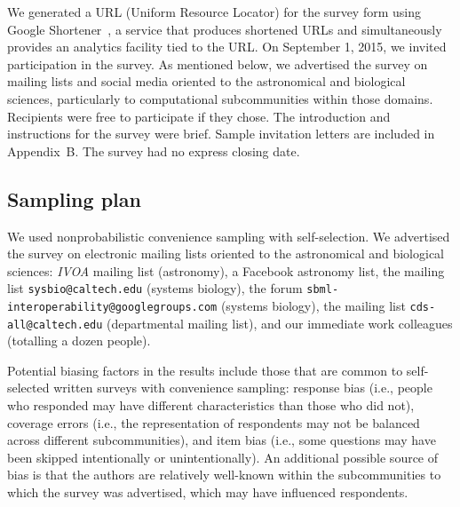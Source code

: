 \documentclass{casicswhitepaper}
\begin{document}
We generated a URL (Uniform Resource Locator) for the survey form using Google Shortener~\cite{googl}, a service that produces shortened URLs and simultaneously provides an analytics facility tied to the URL.  On September 1, 2015, we invited participation in the survey.  As mentioned below, we advertised the survey on mailing lists and social media oriented to the astronomical and biological sciences, particularly to computational subcommunities within those domains.  Recipients were free to participate if they chose.  The introduction and instructions for the survey were brief.  Sample invitation letters are included in Appendix~B.  The survey had no express closing date.


\subsection{Sampling plan}
\label{sampling-plan}

%

\newcommand{\totalPotentialRecipients}{2300\xspace}
\newcommand{\totalClicks}{172\xspace}
\newcommand{\accessRate}{7.5\%\xspace}
\newcommand{\populationResponseRate}{3\%\xspace}
\newcommand{\completionRate}{40\%\xspace}

We used nonprobabilistic convenience sampling with self-selection.  We   advertised the survey on electronic mailing lists oriented to the astronomical and biological sciences: \emph{IVOA} mailing list (astronomy), a Facebook astronomy list, the mailing list \texttt{sysbio@caltech.edu} (systems biology), the forum \texttt{sbml-interoperability@googlegroups.com} (systems biology), the mailing list \texttt{cds-all@caltech.edu} (departmental mailing list), and our immediate work colleagues (totalling a dozen people).

Potential biasing factors in the results include those that are common to self-selected written surveys with convenience sampling: response bias (i.e., people who responded may have different characteristics than those who did not), coverage errors (i.e., the representation of respondents may not be balanced across different subcommunities), and item bias (i.e., some questions may have been skipped intentionally or unintentionally).  An additional possible source of bias is that the authors are relatively well-known within the subcommunities to which the survey was advertised, which may have influenced respondents.  
\end{document}
